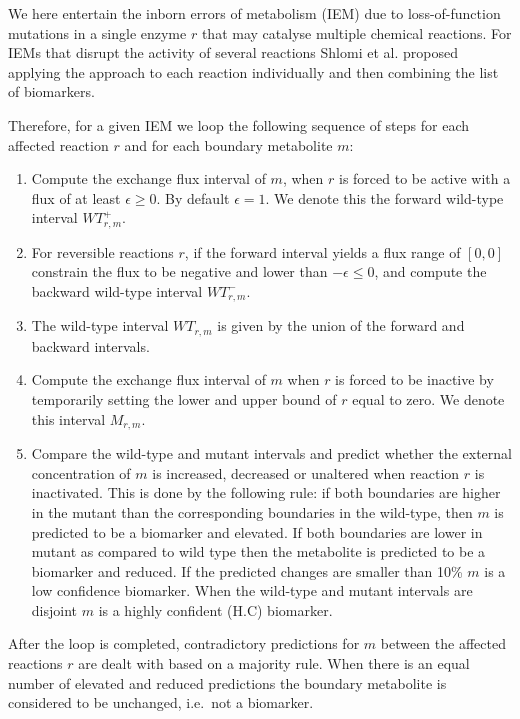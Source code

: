\documentclass[10pt,a4paper,onecolumn]{article}
\newcommand{\tightlist}{%
  \setlength{\itemsep}{1pt}\setlength{\parskip}{0pt}\setlength{\parsep}{0pt}}
\begin{document}
We here entertain the inborn errors of metabolism (IEM) due to
loss-of-function mutations in a single enzyme \(r\) that may catalyse
multiple chemical reactions. For IEMs that disrupt the activity of
several reactions Shlomi et al. proposed applying the approach to each
reaction individually and then combining the list of biomarkers.

Therefore, for a given IEM we loop the following sequence of steps for
each affected reaction \(r\) and for each boundary metabolite \(m\):

\begin{enumerate}
\def\labelenumi{\arabic{enumi}.}
\tightlist
\item
  Compute the exchange flux interval of \(m\), when \(r\) is forced to
  be active with a flux of at least \(\epsilon \geq 0\). By default
  \(\epsilon = 1\). We denote this the forward wild-type interval
  \(WT_{r,m}^+\).
\item
  For reversible reactions \(r\), if the forward interval yields a flux
  range of \([0,0]\) constrain the flux to be negative and lower than
  \(-\epsilon \leq 0\), and compute the backward wild-type interval
  \(WT_{r,m}^-\).
\item
  The wild-type interval \(WT_{r,m}\) is given by the union of the
  forward and backward intervals.\\
\item
  Compute the exchange flux interval of \(m\) when \(r\) is forced to be
  inactive by temporarily setting the lower and upper bound of \(r\)
  equal to zero. We denote this interval \(M_{r,m}\).
\item
  Compare the wild-type and mutant intervals and predict whether the
  external concentration of \(m\) is increased, decreased or unaltered
  when reaction \(r\) is inactivated. This is done by the following
  rule: if both boundaries are higher in the mutant than the
  corresponding boundaries in the wild-type, then \(m\) is predicted to
  be a biomarker and elevated. If both boundaries are lower in mutant as
  compared to wild type then the metabolite is predicted to be a
  biomarker and reduced. If the predicted changes are smaller than 10\%
  \(m\) is a low confidence biomarker. When the wild-type and mutant
  intervals are disjoint \(m\) is a highly confident (H.C) biomarker.
\end{enumerate}

After the loop is completed, contradictory predictions for \(m\) between
the affected reactions \(r\) are dealt with based on a majority rule.
When there is an equal number of elevated and reduced predictions the
boundary metabolite is considered to be unchanged, i.e.~not a biomarker.
\end{document}
